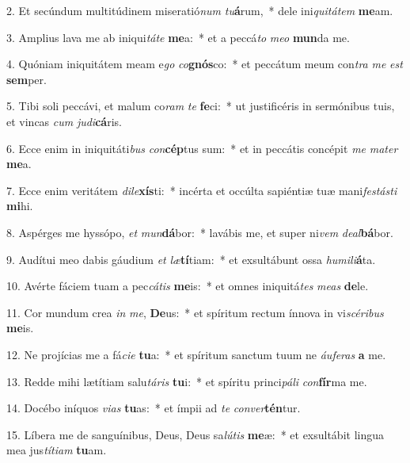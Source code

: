 2. Et secúndum multitúdinem miseratió\textit{num} \textit{tu}\textbf{á}rum,~*  dele ini\textit{qui}\textit{tá}\textit{tem} \textbf{me}am.\

3. Amplius lava me ab iniqui\textit{tá}\textit{te} \textbf{me}a:~*  et a peccá\textit{to} \textit{me}\textit{o} \textbf{mun}da me.\

4. Quóniam iniquitátem meam e\textit{go} \textit{co}\textbf{gnós}co:~*  et peccátum meum con\textit{tra} \textit{me} \textit{est} \textbf{sem}per.\

5. Tibi soli peccávi, et malum co\textit{ram} \textit{te} \textbf{fe}ci:~*  ut justificéris in sermónibus tuis, et vincas \textit{cum} \textit{ju}\textit{di}\textbf{cá}ris.\

6. Ecce enim in iniquitáti\textit{bus} \textit{con}\textbf{cép}tus sum:~*  et in peccátis concépit \textit{me} \textit{ma}\textit{ter} \textbf{me}a.\

7. Ecce enim veritátem \textit{di}\textit{le}\textbf{xís}ti:~*  incérta et occúlta sapiéntiæ tuæ mani\textit{fes}\textit{tás}\textit{ti} \textbf{mi}hi.\

8. Aspérges me hyssópo, \textit{et} \textit{mun}\textbf{dá}bor:~*  lavábis me, et super ni\textit{vem} \textit{de}\textit{al}\textbf{bá}bor.\

9. Audítui meo dabis gáudium \textit{et} \textit{læ}\textbf{tí}tiam:~*  et exsultábunt ossa \textit{hu}\textit{mi}\textit{li}\textbf{á}ta.\

10. Avérte fáciem tuam a pec\textit{cá}\textit{tis} \textbf{me}is:~*  et omnes iniquitá\textit{tes} \textit{me}\textit{as} \textbf{de}le.\

11. Cor mundum crea \textit{in} \textit{me}, \textbf{De}us:~*  et spíritum rectum ínnova in vi\textit{scé}\textit{ri}\textit{bus} \textbf{me}is.\

12. Ne projícias me a fá\textit{ci}\textit{e} \textbf{tu}a:~*  et spíritum sanctum tuum ne \textit{áu}\textit{fe}\textit{ras} \textbf{a} me.\

13. Redde mihi lætítiam salu\textit{tá}\textit{ris} \textbf{tu}i:~*  et spíritu princi\textit{pá}\textit{li} \textit{con}\textbf{fír}ma me.\

14. Docébo iníquos \textit{vi}\textit{as} \textbf{tu}as:~*  et ímpii ad \textit{te} \textit{con}\textit{ver}\textbf{tén}tur.\

15. Líbera me de sanguínibus, Deus, Deus sa\textit{lú}\textit{tis} \textbf{me}æ:~*  et exsultábit lingua mea jus\textit{tí}\textit{ti}\textit{am} \textbf{tu}am.\

